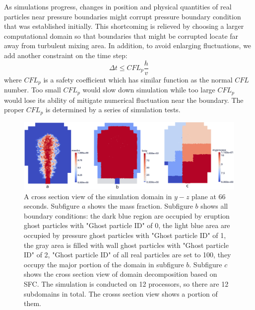 \documentclass[gmd, manuscript]{copernicus}
\begin{document}
As simulations progress, changes in position and physical quantities of real particles near pressure boundaries might corrupt pressure boundary condition that was established initially. This shortcoming is relieved by choosing a larger computational domain so that boundaries that might be corrupted locate far away from turbulent mixing area. In addition, to avoid enlarging fluctuations, we add another constraint on the time step: 
\begin{equation}
\Delta t \leq CFL_p \dfrac{h}{v}
\end{equation}
where $CFL_p$ is a safety coefficient which has similar function as the normal $CFL$ number. Too small $CFL_p$ would slow down simulation while too large $CFL_p$ would lose its ability of mitigate numerical fluctuation near the boundary. The proper $CFL_p$ is determined by a series of simulation tests.

\begin{figure}
\includegraphics[width=18cm]{Fig2}
\caption{A cross section view of the simulation domain in $y-z$ plane at 66 seconds. Subfigure $a$ shows the mass fraction. Subfigure $b$ shows all boundary conditions: the dark blue region are occupied by eruption ghost particles with "Ghost particle ID" of 0, the light blue area are occupied by pressure ghost particles with "Ghost particle ID" of 1, the gray area is filled with wall ghost particles with "Ghost particle ID" of 2, "Ghost particle ID" of all real particles are set to 100, they occupy the major portion of the domain in subfigure $b$. Subfigure $c$ shows the cross section view of domain decomposition based on SFC. The simulation is conducted on 12 processors, so there are 12 subdomains in total. The crosss section view shows a portion of them.}
\label{fig:bc_and_domain_decomp}
\end{figure}
\end{document}
